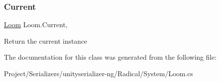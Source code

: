 \subsubsection{\texorpdfstring{Current}{Current}}
{\footnotesize\ttfamily \hyperlink{class_loom}{Loom} Loom.\+Current\hspace{0.3cm}{\ttfamily [static]}, {\ttfamily [get]}}



Return the current instance 



The documentation for this class was generated from the following file\+:\begin{DoxyCompactItemize}
\item 
Project/\+Serializers/unityserializer-\/ng/\+Radical/\+System/Loom.\+cs\end{DoxyCompactItemize}
